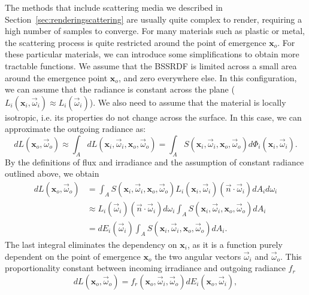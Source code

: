 The methods that include scattering media we described in Section~\ref{sec:renderingscattering} are usually quite complex to render, requiring a high number of samples to converge. For many materials such as plastic or metal, the scattering process  is quite restricted around the point of emergence $\mathbf{x}_o$. For these particular materials, we can introduce some simplifications to obtain more tractable functions. We assume that the BSSRDF is limited across a small area around the emergence point $\mathbf{x}_o$, and zero everywhere else. In this configuration, we can assume that the radiance is constant across the plane ($L_i(\mathbf{x}_i, \vec{\omega}_i) \approx L_i(\vec{\omega}_i)$). We also need to assume that the material is locally isotropic, i.e. its properties do not change across the surface. In this case, we can approximate the outgoing radiance as:
\begin{equation*}
d L(\mathbf{x}_o, \vec{\omega}_o) \approx \int_A d L(\mathbf{x}_i, \vec{\omega}_i, \mathbf{x}_o, \vec{\omega}_o) = \int_A S(\mathbf{x}_i, \vec{\omega}_i, \mathbf{x}_o, \vec{\omega}_o) d \Phi_i(\mathbf{x}_i, \vec{\omega}_i).
\end{equation*}
By the definitions of flux and irradiance and the assumption of constant radiance outlined above, we obtain 
\begin{equation*}
\begin{split}
d L(\mathbf{x}_o, \vec{\omega}_o) &= \int_A S(\mathbf{x}_i, \vec{\omega}_i, \mathbf{x}_o, \vec{\omega}_o) L_i(\mathbf{x}_i, \vec{\omega}_i) (\vec{n} \cdot \vec{\omega}_i) d A_i d \omega_i  \\ &\approx L_i(\vec{\omega}_i) (\vec{n} \cdot \vec{\omega}_i) d \omega_i \int_A S(\mathbf{x}_i, \vec{\omega}_i, \mathbf{x}_o, \vec{\omega}_o)   d A_i \\ &= d E_i(\vec{\omega}_i) \int_A S(\mathbf{x}_i, \vec{\omega}_i, \mathbf{x}_o, \vec{\omega}_o) d A_i.
\end{split}
\end{equation*}
The last integral eliminates the dependency on $\mathbf{x}_i$, as it is a function purely dependent on the point of emergence $\mathbf{x}_o$ the two angular vectors $\vec{\omega}_i$ and $\vec{\omega}_o$. This proportionality constant between incoming irradiance and outgoing radiance $f_r$
\begin{equation}
\label{eq:brdf}
d L(\mathbf{x}_o, \vec{\omega}_o) = f_r(\mathbf{x}_o, \vec{\omega}_i, \vec{\omega}_o) d E_i(\mathbf{x}_o, \vec{\omega}_i),
\end{equation}
